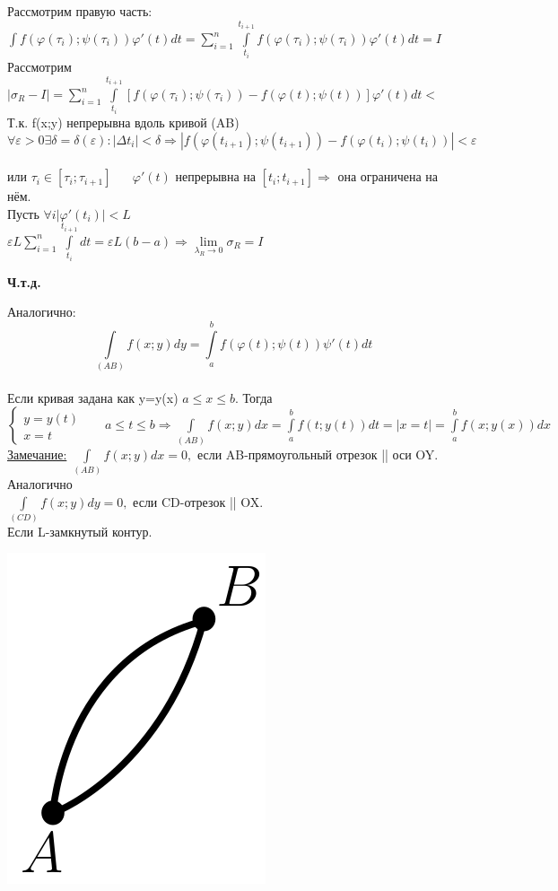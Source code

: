 \documentclass[12pt]{article}
\let\ORIincludegraphics\includegraphics
\renewcommand{\includegraphics}[2][]{\ORIincludegraphics[scale=0.65,#1]{#2}}
\let\oldint\int
\let\oldsum\sum
\let\oldlim\lim
\renewcommand{\int}{\oldint\limits}
\renewcommand{\sum}{\oldsum\limits}
\renewcommand{\lim}{\oldlim\limits}
\begin{document}
  Рассмотрим правую часть: $\int f(\varphi(\tau_i);\psi(\tau_i))\varphi'(t)dt = \sum_{i=1}^{n}
    \int_{t_i}^{t_{i+1}}f(\varphi(\tau_i);\psi(\tau_i))\varphi'(t)dt=I$\\
  Рассмотрим $|\sigma_R-I|=\sum_{i=1}^{n} \int_{t_i}^{t_{i+1}} [f(\varphi(\tau_i);\psi(\tau_i))-
  f(\varphi(t);\psi(t))]\varphi'(t)dt \boxed{<}$\\
  Т.к. f(x;y) непрерывна вдоль кривой (AB)\\
  \[\forall \varepsilon >0 \exists \delta = \delta(\varepsilon):|\Delta t_i| < \delta \Rightarrow
  |f(\varphi(t_{i+1});\psi(t_{i+1}))-f(\varphi(t_i);\psi(t_i))|<\varepsilon\]\\
  или $\tau_i \in [\tau_i;\tau_{i+1}] \hspace{20pt} \varphi'(t)$ непрерывна на $[t_i;t_{i+1}] \Rightarrow$ она ограничена на нём.\\
  Пусть $\forall i |\varphi'(t_i)|<L$\\
  \boxed{<} $\varepsilon L \sum_{i=1}^{n} \int_{t_i}^{t_{i+1}}dt=\varepsilon L(b-a)\Rightarrow \lim_{\lambda_R \to 0}\sigma_R=I$
  \begin{center}
    \textbf{Ч.т.д.}
  \end{center}
  Аналогично: \[\int_{(AB)}f(x;y)dy=\int_{a}^{b}f(\varphi(t);\psi(t))\psi'(t)dt\]\\
  Если кривая задана как y=y(x) \hspace{10pt} $a\leq x\leq b$. Тогда\\
  $\begin{cases}
    y=y(t)\\
    x=t
  \end{cases} \hspace{20pt} a\leq t\leq b \Rightarrow \int_{(AB)}f(x;y)dx =\int_{a}^{b} f(t;y(t))dt=
  |x=t|=\int_{a}^{b}f(x;y(x))dx$\\
  \underline{Замечание:} $\int_{(AB)}f(x;y)dx=0,$ если AB-прямоугольный отрезок || оси OY. Аналогично \\
  $\int_{(CD)}f(x;y)dy=0,$ если CD-отрезок || OX.\\
  Если L-замкнутый контур.\\
  \begin{minipage}{0.45\textwidth}
    \includegraphics[scale=0.6]{8.4.2.png} 
  \end{minipage}
\end{document}
